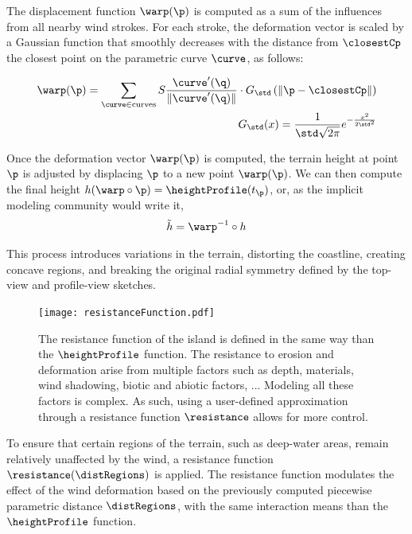 The displacement function $\warp(\p)$ is computed as a sum of the influences from all nearby wind strokes. For each stroke, the deformation vector is scaled by a Gaussian function that smoothly decreases with the distance from $\closestCp$ the closest point on the parametric curve $\curve$, as follows:

\begin{align}
    \warp(\p) = \sum_{\curve \in \text{curves}} S \frac{\curve'(\q)}{\| \curve'(\q) \| } \cdot G_\std\left(\| \p - \closestCp \| \right) %
    \\
    G_\std(x) = \frac{1}{\std \sqrt{2\pi}} e^{-\frac{x^2}{2 \std^2}}
\end{align}

Once the deformation vector $\warp(\p)$ is computed, the terrain height at point $\p$ is adjusted by displacing $\p$ to a new point $\warp(\p)$.
We can then compute the final height $h(\warp \circ \p) = \heightProfile(t_{\p})$, or, as the implicit modeling community would write it, 
\begin{align}
    \Tilde{h} = \warp^{-1} \circ h
\end{align}

This process introduces variations in the terrain, distorting the coastline, creating concave regions, and breaking the original radial symmetry defined by the top-view and profile-view sketches.


\begin{figure}[H]
	\centering
	\texttt{[image: resistanceFunction.pdf]}
    \caption{The resistance function of the island is defined in the same way than the $\heightProfile$ function. The resistance to erosion and deformation arise from multiple factors such as depth, materials, wind shadowing, biotic and abiotic factors, ... Modeling all these factors is complex. As such, using a user-defined approximation through a resistance function $\resistance$ allows for more control. }
    \label{fig:coral-island_resistance-function}
\end{figure}

To ensure that certain regions of the terrain, such as deep-water areas, remain relatively unaffected by the wind, a resistance function $\resistance(\distRegions)$ is applied. The resistance function modulates the effect of the wind deformation based on the previously computed piecewise parametric distance $\distRegions$, with the same interaction means than the $\heightProfile$ function.

